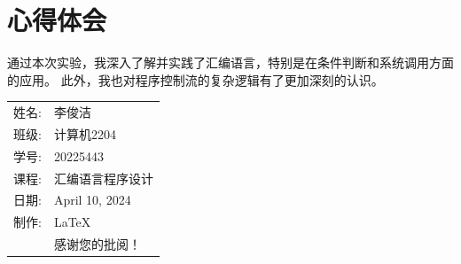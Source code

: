 \documentclass[12pt]{article}
\begin{document}
\section{心得体会}

通过本次实验，我深入了解并实践了汇编语言，特别是在条件判断和系统调用方面的应用。
此外，我也对程序控制流的复杂逻辑有了更加深刻的认识。

\begin{flushright}\begin{tabular}{rl}
    姓名: & 李俊洁\\
    班级: & 计算机2204 \\
    学号: & 20225443 \\
    课程: & 汇编语言程序设计 \\
    日期: & April 10, 2024 \\
    制作: & \LaTeX \\
    & 感谢您的批阅！
\end{tabular}\end{flushright}
\end{document}

